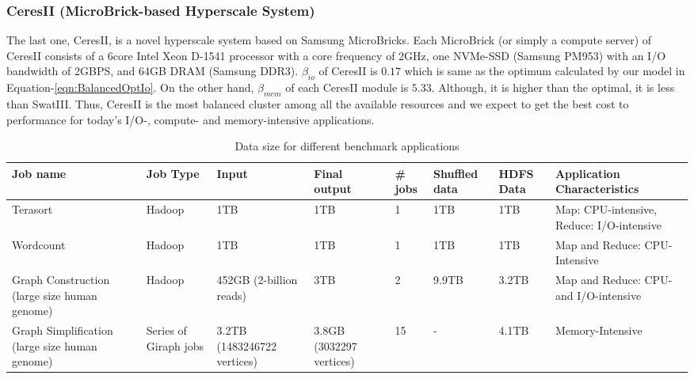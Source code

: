 \documentclass[journal]{IEEEtran}
\begin{document}
\subsubsection{CeresII (MicroBrick-based Hyperscale System)}
The last one, CeresII, is a novel hyperscale system based on Samsung MicroBricks. Each MicroBrick (or simply a compute server) of CeresII consists of a 6core Intel Xeon D-1541 processor with a core frequency of 2GHz, one NVMe-SSD (Samsung PM953) with an I/O bandwidth of 2GBPS, and 64GB DRAM (Samsung DDR3). $\beta_{io}$ of CeresII is $0.17$ which is same as the optimum calculated by our model in Equation-\ref{eqn:BalancedOptIo}. On the other hand, $\beta_{mem}$ of each CeresII module is $5.33$. Although, it is higher than the optimal, it is less than SwatIII. Thus, CeresII is the most balanced cluster among all the available resources and we expect to get the best cost to performance for today's I/O-, compute- and memory-intensive applications. 
\begin{table}
\caption{Data size for different benchmark applications}
\label{tab:AppChar}
\begin{center}
    \begin{tabular}{ |p{3cm} | p{1.5cm} | p{2.5cm} | p{2.5cm} | p{0.8cm} | p{0.8cm} | p{0.8cm} | p{2.5cm}|} \hline
     Job name & Job Type & Input & Final output & \# jobs & Shuffled data & HDFS Data & Application Characteristics \\ \hline
    Terasort & Hadoop & 1TB & 1TB & 1 & 1TB & 1TB & Map: CPU-intensive, Reduce: I/O-intensive \\ \hline
    Wordcount & Hadoop & 1TB & 1TB & 1 & 1TB & 1TB & Map and Reduce: CPU-Intensive \\ \hline 
    Graph Construction (large size human genome) & Hadoop & 452GB (2-billion reads) & 3TB & 2 & 9.9TB & 3.2TB &Map and Reduce: CPU- and I/O-intensive\\ \hline
    Graph Simplification (large size human genome) & Series of Giraph jobs & 3.2TB (1483246722 vertices) & 3.8GB (3032297 vertices) & 15 & - & 4.1TB & Memory-Intensive \\ \hline 
    \end{tabular}
\end{center}
\end{table}
\end{document}
